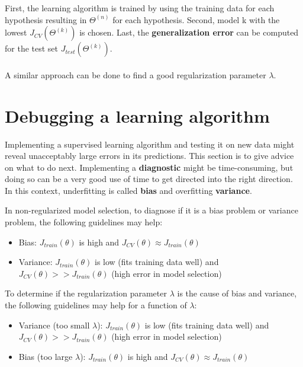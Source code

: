 \documentclass{report}
\begin{document}
First, the learning algorithm is trained by using the training data for each hypothesis resulting in $\Theta^{(n)}$ for each hypothesis. Second, model {k} with the lowest $J_{CV}(\Theta^{(k)})$ is chosen. Last, the {\bf generalization error} can be computed for the test set $J_{test}(\Theta^{(k)})$.
\\
\\
A similar approach can be done to find a good regularization parameter $\lambda$.

\section{Debugging a learning algorithm}
\label{chapter:debugginglearning}
Implementing a supervised learning algorithm and testing it on new data might reveal unacceptably large errors in its predictions. This section is to give advice on what to do next. Implementing a {\bf diagnostic} might be time-consuming, but doing so can be a very good use of time to get directed into the right direction. In this context, underfitting is called {\bf bias} and overfitting {\bf variance}.

In non-regularized model selection, to diagnose if it is a bias problem or variance problem, the following guidelines may help:
\begin{itemize}
\item Bias: $J_{train}(\theta)$ is high and $J_{CV}(\theta)\approx J_{train}(\theta)$
\item Variance: $J_{train}(\theta)$ is low (fits training data well) and $J_{CV}(\theta)>>J_{train}(\theta)$ (high error in model selection)
\end{itemize}

To determine if the regularization parameter $\lambda$ is the cause of bias and variance, the following guidelines may help for a function of $\lambda$:
\begin{itemize}
\item Variance (too small $\lambda$): $J_{train}(\theta)$ is low (fits training data well) and $J_{CV}(\theta)>>J_{train}(\theta)$ (high error in model selection)
\item Bias (too large $\lambda$): $J_{train}(\theta)$ is high and $J_{CV}(\theta)\approx J_{train}(\theta)$
\end{itemize}
\end{document}
